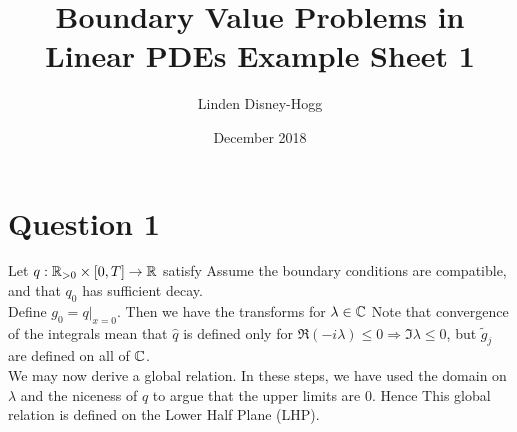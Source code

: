 \documentclass{article}
\title{Boundary Value Problems in Linear PDEs Example Sheet 1}
\author{Linden Disney-Hogg}
\date{December 2018}
\begin{document}
\maketitle
\tableofcontents

\section{Question 1}

Let $q:\mathbb{R}_{>0} \times [0,T] \to \mathbb{R}$ satisfy 
Assume the boundary conditions are compatible, and that $q_0$ has sufficient decay.\\
Define $g_0 = q|_{x=0}$. Then we have the transforms for $\lambda \in \mathbb{C}$
Note that convergence of the integrals mean that $\hat{q}$ is defined only for $\Re(-i\lambda) \leq 0 \Rightarrow \Im \lambda \leq 0$, but $\tilde{g}_j$ are defined on all of $\mathbb{C}$. \\
We may now derive a global relation.
In these steps, we have used the domain on $\lambda$ and the niceness of $q$ to argue that the upper limits are 0. Hence 
This global relation is defined on the Lower Half Plane (LHP). \\
\end{document}
